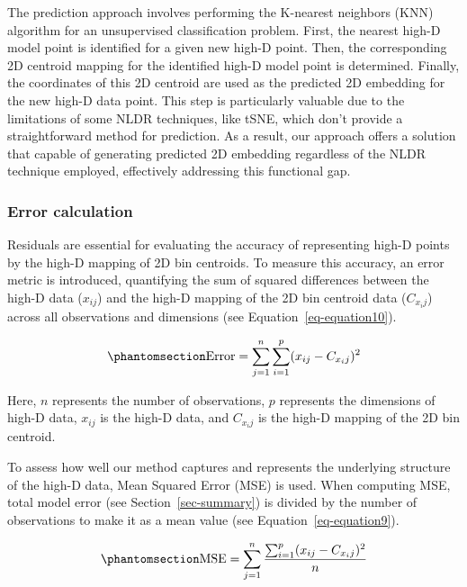 \documentclass[
  12pt]{article}
\begin{document}
The prediction approach involves performing the K-nearest neighbors
(KNN) algorithm for an unsupervised classification problem. First, the
nearest high-D model point is identified for a given new high-D point.
Then, the corresponding 2D centroid mapping for the identified high-D
model point is determined. Finally, the coordinates of this 2D centroid
are used as the predicted 2D embedding for the new high-D data point.
This step is particularly valuable due to the limitations of some NLDR
techniques, like tSNE, which don't provide a straightforward method for
prediction. As a result, our approach offers a solution that capable of
generating predicted 2D embedding regardless of the NLDR technique
employed, effectively addressing this functional gap.

\subsubsection{Error calculation}\label{error-calculation}

Residuals are essential for evaluating the accuracy of representing
high-D points by the high-D mapping of 2D bin centroids. To measure this
accuracy, an error metric is introduced, quantifying the sum of squared
differences between the high-D data (\(x_{ij}\)) and the high-D mapping
of the 2D bin centroid data (\(C_{x_ij}\)) across all observations and
dimensions (see Equation~\ref{eq-equation10}).

\begin{equation}\phantomsection\label{eq-equation10}{
\text{Error} = \sum_{j = 1}^{n}\sum_{i = 1}^{p} (x_{ij} - C_{x_ij})^2
}\end{equation}

Here, \(n\) represents the number of observations, \(p\) represents the
dimensions of high-D data, \(x_{ij}\) is the high-D data, and
\(C_{x_ij}\) is the high-D mapping of the 2D bin centroid.

To assess how well our method captures and represents the underlying
structure of the high-D data, Mean Squared Error (MSE) is used. When
computing MSE, total model error (see Section~\ref{sec-summary}) is
divided by the number of observations to make it as a mean value (see
Equation~\ref{eq-equation9}).

\begin{equation}\phantomsection\label{eq-equation9}{
\text{MSE} = \sum_{j = 1}^{n} \frac{\sum_{i = 1}^{p} (x_{ij} - C_{x_ij})^2}{n}
}\end{equation}
\end{document}
